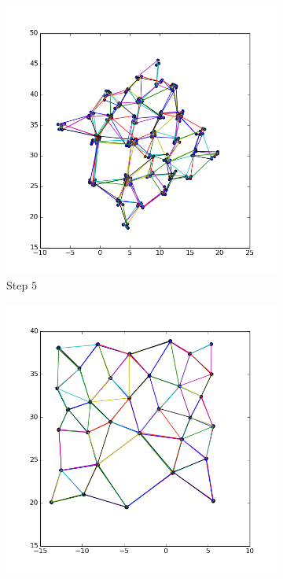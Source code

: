 \documentclass[12pt,a4paper]{article}
\begin{document}
\begin{figure}
\begin{minipage}[0.2\textheight]{\textwidth}	%
	 \begin{subfigure}{0.5\textwidth}
		   \centering
           \includegraphics[scale=0.4]{results_Harel/rand1/HK_step5_eps1.png}
           \caption{Step $5$}
     \end{subfigure}
	 \begin{subfigure}{0.5\textwidth}
	 			\centering
            \includegraphics[scale=0.4]{results_Harel/rand01/HK_step5_eps01.png}

\end{subfigure}
\end{minipage}
\end{figure}
\end{document}
